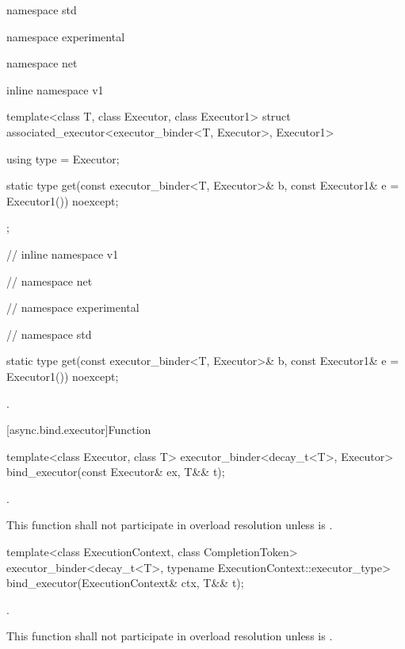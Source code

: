 %
%
\begin{codeblock}
namespace std {
namespace experimental {
namespace net {
inline namespace v1 {

  template<class T, class Executor, class Executor1>
    struct associated_executor<executor_binder<T, Executor>, Executor1>
  {
    using type = Executor;

    static type get(const executor_binder<T, Executor>& b,
                    const Executor1& e = Executor1()) noexcept;
  };

} // inline namespace v1
} // namespace net
} // namespace experimental
} // namespace std
\end{codeblock}

\begin{itemdecl}
static type get(const executor_binder<T, Executor>& b,
                const Executor1& e = Executor1()) noexcept;
\end{itemdecl}

\begin{itemdescr}
\pnum
\returns {}.
\end{itemdescr}




[async.bind.executor]{Function }

%
\begin{itemdecl}
template<class Executor, class T>
  executor_binder<decay_t<T>, Executor>
    bind_executor(const Executor& ex, T&& t);
\end{itemdecl}

\begin{itemdescr}
\pnum
\returns {}.

\pnum
\remarks This function shall not participate in overload resolution unless
 is .
\end{itemdescr}

%
\begin{itemdecl}
template<class ExecutionContext, class CompletionToken>
  executor_binder<decay_t<T>, typename ExecutionContext::executor_type>
    bind_executor(ExecutionContext& ctx, T&& t);
\end{itemdecl}

\begin{itemdescr}
\pnum
\returns {}.

\pnum
\remarks This function shall not participate in overload resolution unless  is .
\end{itemdescr}



